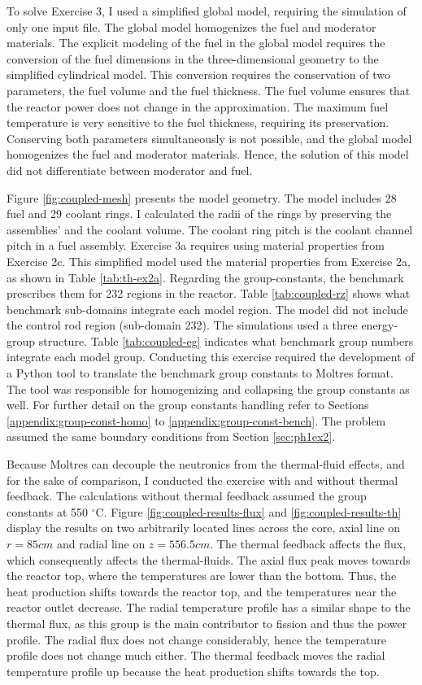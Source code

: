 To solve Exercise 3, I used a simplified global model, requiring the simulation of only one input file.
The global model homogenizes the fuel and moderator materials.
The explicit modeling of the fuel in the global model requires the conversion of the fuel dimensions in the three-dimensional geometry to the simplified cylindrical model.
This conversion requires the conservation of two parameters, the fuel volume and the fuel thickness.
The fuel volume ensures that the reactor power does not change in the approximation.
The maximum fuel temperature is very sensitive to the fuel thickness, requiring its preservation.
Conserving both parameters simultaneously is not possible, and the global model homogenizes the fuel and moderator materials.
Hence, the solution of this model did not differentiate between moderator and fuel.

Figure \ref{fig:coupled-mesh} presents the model geometry.
The model includes 28 fuel and 29 coolant rings.
I calculated the radii of the rings by preserving the assemblies' and the coolant volume.
The coolant ring pitch is the coolant channel pitch in a fuel assembly.
Exercise 3a requires using material properties from Exercise 2c.
This simplified model used the material properties from Exercise 2a, as shown in Table \ref{tab:th-ex2a}.
Regarding the group-constants, the benchmark prescribes them for 232 regions in the reactor.
Table \ref{tab:coupled-rz} shows what benchmark sub-domains integrate each model region.
The model did not include the control rod region (sub-domain 232).
The simulations used a three energy-group structure.
Table \ref{tab:coupled-eg} indicates what benchmark group numbers integrate each model group.
Conducting this exercise required the development of a Python tool to translate the benchmark group constants to Moltres format.
The tool was responsible for homogenizing and collapsing the group constants as well.
For further detail on the group constants handling refer to Sections \ref{appendix:group-const-homo} to \ref{appendix:group-const-bench}.
The problem assumed the same boundary conditions from Section \ref{sec:ph1ex2}.

Because Moltres can decouple the neutronics from the thermal-fluid effects, and for the sake of comparison, I conducted the exercise with and without thermal feedback.
The calculations without thermal feedback assumed the group constants at 550 $^{\circ}$C.
Figure \ref{fig:coupled-results-flux} and \ref{fig:coupled-results-th} display the results on two arbitrarily located lines across the core, axial line on $r=85 cm$ and radial line on $z=556.5 cm$.
The thermal feedback affects the flux, which consequently affects the thermal-fluids.
The axial flux peak moves towards the reactor top, where the temperatures are lower than the bottom.
Thus, the heat production shifts towards the reactor top, and the temperatures near the reactor outlet decrease.
The radial temperature profile has a similar shape to the thermal flux, as this group is the main contributor to fission and thus the power profile.
The radial flux does not change considerably, hence the temperature profile does not change much either.
The thermal feedback moves the radial temperature profile up because the heat production shifts towards the top.

